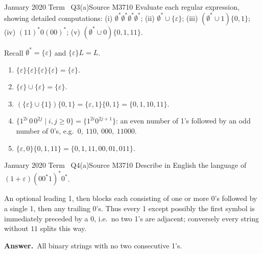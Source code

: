\documentclass[11pt,a4paper]{article}
\newcommand{\eps}{\varepsilon}
\newcommand{\ans}[1]{\par\smallskip\noindent\colorbox{mist}{\parbox{\dimexpr\linewidth-2\fboxsep}{\sffamily\small\textbf{\color{teal}Answer.}\ \color{ink}#1}}\par}
\begin{document}
\begin{question}{January 2020 Term \textbullet\ Q3(a)}{Source M37}{10}
Evaluate each regular expression, showing detailed computations:
(i) $\emptyset^*\emptyset^*\emptyset^*\emptyset^*$; (ii) $\emptyset^*\cup\{\eps\}$; (iii) $(\emptyset^*\cup1)\{0,1\}$; (iv) $(11)^*0(00)^*$; (v) $(\emptyset^*\cup0)\{0,1,11\}$.
\end{question}
\begin{solution}
Recall $\emptyset^*=\{\eps\}$ and $\{\eps\}L=L$.
\begin{enumerate}
\item $\{\eps\}\{\eps\}\{\eps\}\{\eps\}=\{\eps\}$.
\item $\{\eps\}\cup\{\eps\}=\{\eps\}$.
\item $(\{\eps\}\cup\{1\})\{0,1\}=\{\eps,1\}\{0,1\}=\{0,1,10,11\}$.
\item $\{1^{2i}\,0\,0^{2j}\mid i,j\ge0\}=\{1^{2i}0^{2j+1}\}$: an even number of 1's followed by an odd number of 0's, e.g.\ $0,\ 110,\ 000,\ 11000$.
\item $\{\eps,0\}\{0,1,11\}=\{0,1,11,00,01,011\}$.
\end{enumerate}
\end{solution}

\begin{question}{January 2020 Term \textbullet\ Q4(a)}{Source M37}{10}
Describe in English the language of $(1+\eps)(00^*1)^*0^*$.
\end{question}
\begin{solution}
An optional leading 1, then blocks each consisting of one or more 0's followed by a single 1, then any trailing 0's. Thus every 1 except possibly the first symbol is immediately preceded by a 0, i.e.\ no two 1's are adjacent; conversely every string without $11$ splits this way.
\ans{All binary strings with no two consecutive 1's.}
\end{solution}
\end{document}
